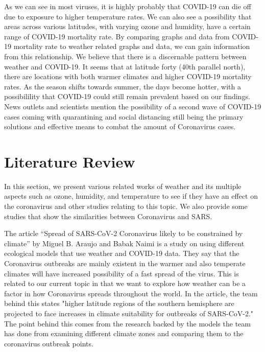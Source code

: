 \documentclass[10pt,journal,compsoc]{IEEEtran}
\begin{document}
	As we can see in most viruses, it is highly probably that COVID-19 can die off due to exposure to higher temperature rates. We can also see a possibility that areas across various latitudes, with varying ozone and humidity, have a certain range of COVID-19 mortality rate. By comparing graphs and data from COVID-19 mortality rate to weather related graphs and data, we can gain information from this relationship. We believe that there is a discernable pattern between weather and COVID-19. It seems that at latitude forty (40th parallel north), there are locations with both warmer climates and higher COVID-19 mortality rates. As the season shifts towards summer, the days become hotter, with a possibilility that COVID-19 could still remain prevalent based on our findings. News outlets and scientists mention the possibility of a second wave of COVID-19 cases coming with quarantining and social distancing still being the primary solutions and effective means to combat the amount of Coronavirus cases.

\section{Literature Review}
\label{literature review}

	In this section, we present various related works of weather and its multiple aspects such as ozone, humidity, and temperature to see if they have an effect on the coronavirus and other studies relating to this topic. We also provide some studies that show the similarities between Coronavirus and SARS.
	
	The article “Spread of SARS-CoV-2 Coronavirus likely to be constrained by climate” by Miguel B. Araujo and Babak Naimi is a study on using different ecological models that use weather and COVID-19 data. \cite{Araujo-2020} They say that the Coronavirus outbreaks are mainly existent in the warmer and also temperate climates will have increased possibility of a fast spread of the virus. This is related to our current topic in that we want to explore how weather can be a factor in how Coronavirus spreads throughout the world. In the article, the team behind this states "higher latitude regions of the southern hemisphere are projected to face increases in climate suitability for outbreaks of SARS-CoV-2." The point behind this comes from the research backed by the models the team has done from examining different climate zones and comparing them to the coronavirus outbreak points. \cite{Araujo-2020}
\end{document}
